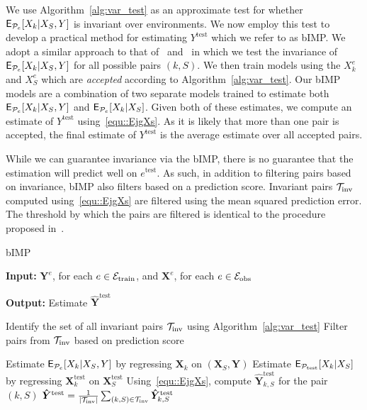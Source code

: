 \documentclass[conference,letterpaper]{IEEEtran}
\begin{document}
We use Algorithm~\ref{alg:var_test} as an approximate test for whether $\operatorname{\sf E}_{\mathcal{P}_e}[X_k|X_S,Y]$ is invariant over environments. We now employ this test to develop a practical method for estimating $Y^{\text{test}}$ which we refer to as \textsf{bIMP}. We adopt a similar approach to that of~\cite{pfister2021stabilizing} and~\cite{du2023learning} in which we test the invariance of $\operatorname{\sf E}_{\mathcal{P}_e}[X_k|X_S,Y]$ for all possible pairs $(k,S)$. We then train models using the $X_k^e$ and $X^e_S$ which are \emph{accepted} according to Algorithm~\ref{alg:var_test}. Our bIMP models are a combination of two separate models trained to estimate both $\operatorname{\sf E}_{\mathcal{P}_e}[X_k|X_S,Y]$ and $\operatorname{\sf E}_{\mathcal{P}_e}[X_k|X_S]$. Given both of these estimates, we compute an estimate of $Y^{\text{test}}$ using~\eqref{equ::EjgXs}. As it is likely that more than one pair is accepted, the final estimate of $Y^{\text{test}}$ is the average estimate over all accepted pairs. 

While we can guarantee invariance via the bIMP, there is no guarantee that the estimation will predict well on $e^{\text{test}}$. As such, in addition to filtering pairs based on invariance, \textsf{bIMP} also filters based on a prediction score. Invariant pairs $\mathcal{T}_{\text{inv}}$ computed using~\eqref{equ::EjgXs} are filtered using the mean squared prediction error. The threshold by which the pairs are filtered is identical to the procedure proposed in~\cite{pfister2021stabilizing}. 

\begin{algorithm}
\caption{\textsf{bIMP}}\label{alg:method}
 \textbf{Input:} $\bm{Y}^e$, for each $e\in\mathcal{E}_{\text{train}}$, and $\bm{X}^e$, for each $e\in\mathcal{E}_{\text{obs}}$

\textbf{Output:} Estimate $\bm{\hat{Y}}^{\text{test}}$
\begin{algorithmic}
\State   Identify the set of all invariant pairs $\mathcal{T}_{\text{inv}}$ using Algorithm~\ref{alg:var_test}
\State  Filter pairs from $\mathcal{T}_{\text{inv}}$ based on prediction score 

\State Estimate $\operatorname{\sf E}_{\mathcal{P}_e}[X_k|X_S,Y]$ by regressing $\bm{X}_k$ on $(\bm{X}_S,\bm{Y})$
\State Estimate $\operatorname{\sf E}_{\mathcal{P}_{\text{test}}}[X_k|X_S]$ by regressing $\bm{X}_k^{\text{test}}$ on $\bm{X}^{\text{test}}_S$ 
\State Using~\eqref{equ::EjgXs}, compute $\bm{\hat{Y}}_{k,S}^{\text{test}}$ for the pair $(k,S)$
\EndFor
\State $\bm{\hat{Y}}^{\text{test}} = \frac{1}{|\mathcal{T}_{\text{inv}}|}\sum_{(k,S)\in\mathcal{T}_{\text{inv}}} \bm{\hat{Y}}_{k,S}^{\text{test}}$
\end{algorithmic}
\end{algorithm}
\end{document}
